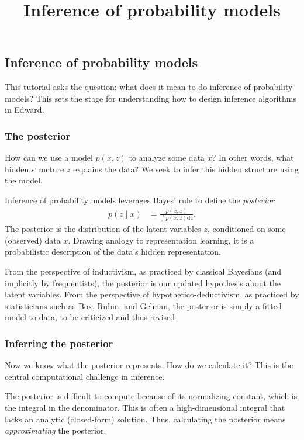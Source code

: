 \title{Inference of probability models}

\subsection{Inference of probability models}

This tutorial asks the question: what does it mean to do inference of
probability models? This sets the stage for understanding how to
design inference algorithms in Edward.

\subsubsection{The posterior}

How can we use a model $p(x,z)$ to analyze some data $x$? In other words,
what hidden structure $z$ explains the data? We seek to infer this
hidden structure using the model.

Inference of probability models leverages Bayes' rule to define the
\emph{posterior}
\begin{align*}
  p(z \mid x)
  &=
  \frac{p(x,z)}{\int p(x,z) \text{d}z}.
\end{align*}
The posterior is the distribution of the latent variables $z$, conditioned on
some (observed) data $x$.
Drawing analogy to representation learning, it is a probabilistic
description of the data's hidden representation.

From the perspective of inductivism, as practiced by classical
Bayesians (and implicitly by frequentists),
the posterior is our updated hypothesis about the latent variables.
From the perspective of hypothetico-deductivism, as practiced by
statisticians such as Box, Rubin, and Gelman, the posterior is simply
a fitted model to data, to be criticized and thus revised
\citep{box1982apology,gelman2013philosophy}


\subsubsection{Inferring the posterior}

Now we know what the posterior represents. How do we calculate it? This is the
central computational challenge in inference.

The posterior is difficult to compute because of its normalizing
constant, which is the integral in the denominator.
This is often a high-dimensional integral that lacks an analytic (closed-form)
solution. Thus, calculating the posterior means \emph{approximating} the
posterior.

